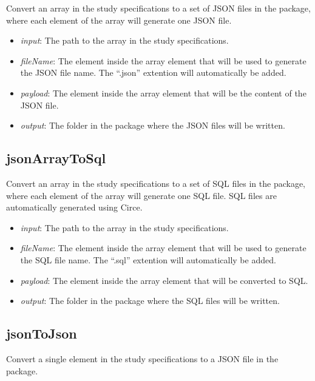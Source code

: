 \documentclass[]{article}
\providecommand{\tightlist}{%
  \setlength{\itemsep}{0pt}\setlength{\parskip}{0pt}}
\begin{document}
Convert an array in the study specifications to a set of JSON files in
the package, where each element of the array will generate one JSON
file.

\begin{itemize}
\tightlist
\item
  \emph{input}: The path to the array in the study specifications.
\item
  \emph{fileName}: The element inside the array element that will be
  used to generate the JSON file name. The ``.json'' extention will
  automatically be added.
\item
  \emph{payload}: The element inside the array element that will be the
  content of the JSON file.
\item
  \emph{output}: The folder in the package where the JSON files will be
  written.
\end{itemize}

\hypertarget{jsonarraytosql}{%
\subsection{jsonArrayToSql}\label{jsonarraytosql}}

Convert an array in the study specifications to a set of SQL files in
the package, where each element of the array will generate one SQL file.
SQL files are automatically generated using Circe.

\begin{itemize}
\tightlist
\item
  \emph{input}: The path to the array in the study specifications.
\item
  \emph{fileName}: The element inside the array element that will be
  used to generate the SQL file name. The ``.sql'' extention will
  automatically be added.
\item
  \emph{payload}: The element inside the array element that will be
  converted to SQL.
\item
  \emph{output}: The folder in the package where the SQL files will be
  written.
\end{itemize}

\hypertarget{jsontojson}{%
\subsection{jsonToJson}\label{jsontojson}}

Convert a single element in the study specifications to a JSON file in
the package.
\end{document}
